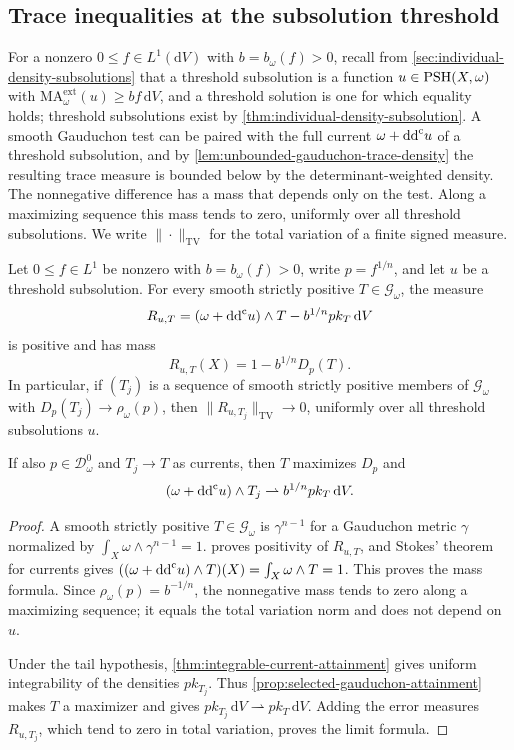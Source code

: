 \subsection{Trace inequalities at the subsolution threshold}
\label{subsec:threshold-trace-inequalities}

For a nonzero $0\leq f\in L^1(\mathrm{d}V)$ with $b=b_\omega(f)>0$, recall from \cref{sec:individual-density-subsolutions} that a threshold subsolution is a function $u\in\mathrm{PSH}(X,\omega)$ with $\mathrm{MA}^{\mathrm{ext}}_\omega(u)\geq bf\,\mathrm{d}V$, and a threshold solution is one for which equality holds; threshold subsolutions exist by \cref{thm:individual-density-subsolution}. A smooth Gauduchon test can be paired with the full current $\omega+\mathrm{dd}^{\mathrm{c}} u$ of a threshold subsolution, and by \cref{lem:unbounded-gauduchon-trace-density} the resulting trace measure is bounded below by the determinant-weighted density. The nonnegative difference has a mass that depends only on the test. Along a maximizing sequence this mass tends to zero, uniformly over all threshold subsolutions. We write $\|\cdot\|_{\mathrm{TV}}$ for the total variation of a finite signed measure.

\begin{proposition}\label{prop:threshold-trace-saturation}
Let $0\leq f\in L^1$ be nonzero with $b=b_\omega(f)>0$, write $p=f^{1/n}$, and let $u$ be a threshold subsolution. For every smooth strictly positive $T\in\mathscr G_\omega$, the measure
\[
 R_{u,T}=(\omega+\mathrm{dd}^{\mathrm{c}} u)\wedge T-b^{1/n}p k_T\,\mathrm{d}V
\]
is positive and has mass
\[
 R_{u,T}(X)=1-b^{1/n}D_p(T).
\]
In particular, if $(T_j)$ is a sequence of smooth strictly positive members of $\mathscr G_\omega$ with $D_p(T_j)\to\rho_\omega(p)$, then $\|R_{u,T_j}\|_{\mathrm{TV}}\to0$, uniformly over all threshold subsolutions $u$.

If also $p\in\mathcal D_\omega^0$ and $T_j\to T$ as currents, then $T$ maximizes $D_p$ and
\[
 (\omega+\mathrm{dd}^{\mathrm{c}} u)\wedge T_j
       \rightharpoonup b^{1/n}p k_T\,\mathrm{d}V.
\]
\end{proposition}
\begin{proof}
A smooth strictly positive $T\in\mathscr G_\omega$ is $\gamma^{n-1}$ for a Gauduchon metric $\gamma$ normalized by $\int_X\omega\wedge\gamma^{n-1}=1$.  proves positivity of $R_{u,T}$, and Stokes' theorem for currents gives $((\omega+\mathrm{dd}^{\mathrm{c}} u)\wedge T)(X)=\int_X\omega\wedge T=1$. This proves the mass formula. Since $\rho_\omega(p)=b^{-1/n}$, the nonnegative mass tends to zero along a maximizing sequence; it equals the total variation norm and does not depend on $u$.

Under the tail hypothesis, \cref{thm:integrable-current-attainment} gives uniform integrability of the densities $p k_{T_j}$. Thus \cref{prop:selected-gauduchon-attainment} makes $T$ a maximizer and gives
$p k_{T_j}\,\mathrm{d}V\rightharpoonup p k_T\,\mathrm{d}V$. Adding the error measures $R_{u,T_j}$, which tend to zero in total variation, proves the limit formula.
\end{proof}

